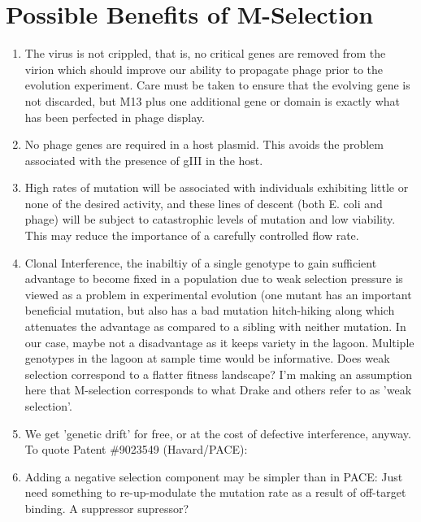 \documentclass[10pt,letterpaper]{article}
\begin{document}
\section{Possible Benefits of M-Selection}
\begin{enumerate}
\item{The virus is not crippled, that is, no critical genes are removed from the virion which should improve our ability to propagate phage prior to the evolution experiment.  Care must be taken to ensure that the evolving gene is not discarded, but M13 plus one additional gene or domain is exactly what has been perfected in phage display.}
\item{No phage genes are required in a host plasmid.  This avoids the problem associated with the presence of gIII in the host.}
\item{High rates of mutation will be associated with individuals exhibiting little or none of the desired activity, and these lines of descent (both E. coli and phage) will be subject to catastrophic levels of mutation and low viability. This may reduce the importance of a carefully controlled flow rate.}
\item{Clonal Interference\cite{dynamics}, the inabiltiy of a single genotype to gain sufficient advantage to become fixed in a population due to weak selection pressure is viewed as a problem in experimental evolution (one mutant has an important beneficial mutation, but also has a bad mutation hitch-hiking along which attenuates the advantage as compared to a sibling with neither mutation. In our case, maybe not a disadvantage as it keeps variety in the lagoon. Multiple genotypes in the lagoon at sample time would be informative. Does weak selection correspond to a flatter fitness landscape? I'm making an assumption here that M-selection corresponds to what Drake and others refer to as 'weak selection'.}

\item{We get 'genetic drift' for free, or at the cost of defective interference, anyway. To quote Patent \#9023549 (Havard/PACE):
}

\item{Adding a negative selection component may be simpler than in PACE: Just need something to re-up-modulate the mutation rate as a result of off-target binding. A suppressor supressor?}

\end{enumerate}
\end{document}
